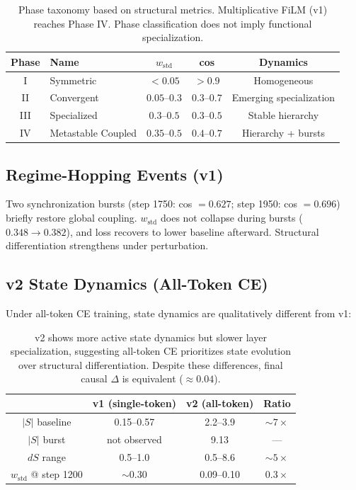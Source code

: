 \documentclass[11pt,a4paper]{article}
\begin{document}
\begin{table}[h]
\centering
\begin{tabular}{clccc}
\toprule
\textbf{Phase} & \textbf{Name} & $w_\mathrm{std}$ & \textbf{cos} & \textbf{Dynamics} \\
\midrule
I   & Symmetric          & $<0.05$       & $>0.9$      & Homogeneous \\
II  & Convergent         & $0.05$--$0.3$ & $0.3$--$0.7$& Emerging specialization \\
III & Specialized        & $0.3$--$0.5$  & $0.3$--$0.5$& Stable hierarchy \\
IV  & Metastable Coupled & $0.35$--$0.5$ & $0.4$--$0.7$& Hierarchy + bursts \\
\bottomrule
\end{tabular}
\caption{Phase taxonomy based on structural metrics. Multiplicative FiLM (v1)
reaches Phase IV. Phase classification does not imply functional specialization.}
\end{table}

\subsection*{Regime-Hopping Events (v1)}

Two synchronization bursts (step 1750: cos $= 0.627$; step 1950: cos $= 0.696$)
briefly restore global coupling. $w_\mathrm{std}$ does not collapse during bursts
($0.348 \to 0.382$), and loss recovers to lower baseline afterward. Structural
differentiation strengthens under perturbation.

\subsection*{v2 State Dynamics (All-Token CE)}

Under all-token CE training, state dynamics are qualitatively different from v1:

\begin{table}[h]
\centering
\begin{tabular}{cccc}
\toprule
& \textbf{v1 (single-token)} & \textbf{v2 (all-token)} & \textbf{Ratio} \\
\midrule
$|S|$ baseline    & 0.15--0.57 & 2.2--3.9  & $\sim 7\times$ \\
$|S|$ burst       & not observed & 9.13     & --- \\
$dS$ range        & 0.5--1.0   & 0.5--8.6  & $\sim 5\times$ \\
$w_\mathrm{std}$ @ step 1200 & $\sim 0.30$ & 0.09--0.10 & $0.3\times$ \\
\bottomrule
\end{tabular}
\caption{v2 shows more active state dynamics but slower layer specialization,
suggesting all-token CE prioritizes state evolution over structural differentiation.
Despite these differences, final causal $\Delta$ is equivalent ($\approx 0.04$).}
\end{table}
\end{document}
